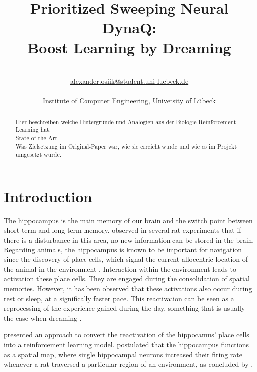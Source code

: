 \documentclass[a4paper]{article}
\title{\textbf{Prioritized Sweeping Neural DynaQ:\\ Boost Learning by Dreaming}}\let\Title\@title
\author{\AuthorName\\
	\href{mailto:alexander.osiik@student.uni-luebeck.de}{alexander.osiik@student.uni-luebeck.de}\\
	\small \seminar\\
	\small Institute of Computer Engineering, University of L\"ubeck\\
}\let\Author\@author
\begin{document}
	\maketitle
	
	\begin{abstract}
		\noindent%
		Hier beschreiben welche Hintergründe und Analogien aus der Biologie Reinforcement Learning hat.\\
		State of the Art.\\
		Was Zielsetzung im Original-Paper war, wie sie erreicht wurde und wie es im Projekt umgesetzt wurde.
	\end{abstract}
	
	
	\section{Introduction}
	\label{sec:introduction}
\par The hippocampus is the main memory of our brain and the switch point between short-term and long-term memory. \citet{OKEEFE1971171} observed in several rat experiments that if there is a disturbance in this area, no new information can be stored in the brain. Regarding animals, the hippocampus is known to be important for navigation since the discovery of place cells, which signal the current allocentric location of the animal in the environment \citep{Maguire}. Interaction within the environment leads to activation these place cells. They are engaged during the consolidation of spatial memories. However, it has been observed that these activations also occur during rest or sleep, at a significally faster pace. This reactivation can be seen as a reprocessing of the experience gained during the day, something that is usually the case when dreaming \citep{HippocampalReplaysGirard}.

\par \citet{NeuralDynaQ} presented an approach to convert the reactivation of the hippocamus' place cells into a reinforcement learning model.  \cite{OKEEFE1971171} postulated that the hippocampus functions as a spatial map, where single hippocampal neurons increased their firing rate whenever a rat traversed a particular region of an environment, as concluded by \cite{Nakazawa}.
		
\end{document}
